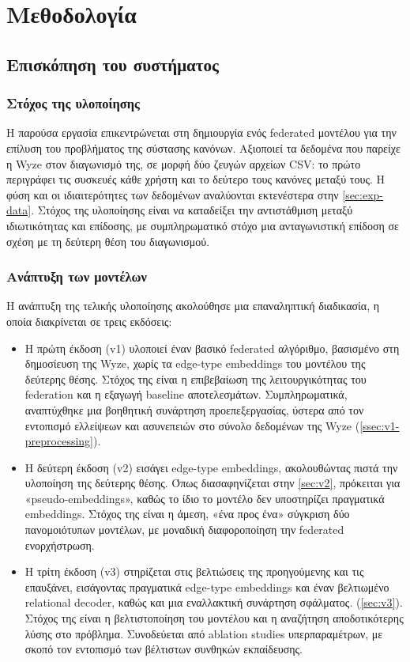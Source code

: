 \chapter{Μεθοδολογία}\label{ch:methodology}
\section{Επισκόπηση του συστήματος}\label{sec:overview}
\subsection{Στόχος της υλοποίησης}\label{ssec:goal}
Η παρούσα εργασία επικεντρώνεται στη δημιουργία ενός federated μοντέλου για την επίλυση του προβλήματος της σύστασης κανόνων. Αξιοποιεί τα δεδομένα που παρείχε η Wyze στον διαγωνισμό της, σε μορφή δύο ζευγών αρχείων CSV: το πρώτο περιγράφει τις συσκευές κάθε χρήστη και το δεύτερο τους κανόνες μεταξύ τους. Η φύση και οι ιδιαιτερότητες των δεδομένων αναλύονται εκτενέστερα στην \autoref{sec:exp-data}. Στόχος της υλοποίησης είναι να καταδείξει την αντιστάθμιση μεταξύ ιδιωτικότητας και επίδοσης, με συμπληρωματικό στόχο μια ανταγωνιστική επίδοση σε σχέση με τη δεύτερη θέση του διαγωνισμού.

\subsection{Ανάπτυξη των μοντέλων}\label{ssec:versions}
Η ανάπτυξη της τελικής υλοποίησης ακολούθησε μια επαναληπτική διαδικασία, η οποία διακρίνεται σε τρεις εκδόσεις:
\begin{itemize}
    \item Η πρώτη έκδοση (v1) υλοποιεί έναν βασικό federated αλγόριθμο, βασισμένο στη δημοσίευση της Wyze, χωρίς τα edge-type embeddings του μοντέλου της δεύτερης θέσης. Στόχος της είναι η επιβεβαίωση της λειτουργικότητας του federation και η εξαγωγή baseline αποτελεσμάτων. Συμπληρωματικά, αναπτύχθηκε μια βοηθητική συνάρτηση προεπεξεργασίας, ύστερα από τον εντοπισμό ελλείψεων και ασυνεπειών στο σύνολο δεδομένων της Wyze (\autoref{ssec:v1-preprocessing}).
    \item Η δεύτερη έκδοση (v2) εισάγει edge-type embeddings, ακολουθώντας πιστά την υλοποίηση της δεύτερης θέσης. Όπως διασαφηνίζεται στην \autoref{sec:v2}, πρόκειται για «pseudo-embeddings», καθώς το ίδιο το μοντέλο δεν υποστηρίζει πραγματικά embeddings. Στόχος της είναι η άμεση, «ένα προς ένα» σύγκριση δύο πανομοιότυπων μοντέλων, με μοναδική διαφοροποίηση την federated ενορχήστρωση.
    \item Η τρίτη έκδοση (v3) στηρίζεται στις βελτιώσεις της προηγούμενης και τις επαυξάνει, εισάγοντας πραγματικά edge-type embeddings και έναν βελτιωμένο relational decoder, καθώς και μια εναλλακτική συνάρτηση σφάλματος. (\autoref{sec:v3}). Στόχος της είναι η βελτιστοποίηση του μοντέλου και η αναζήτηση αποδοτικότερης λύσης στο πρόβλημα. Συνοδεύεται από ablation studies υπερπαραμέτρων, με σκοπό τον εντοπισμό των βέλτιστων συνθηκών εκπαίδευσης.
\end{itemize}

